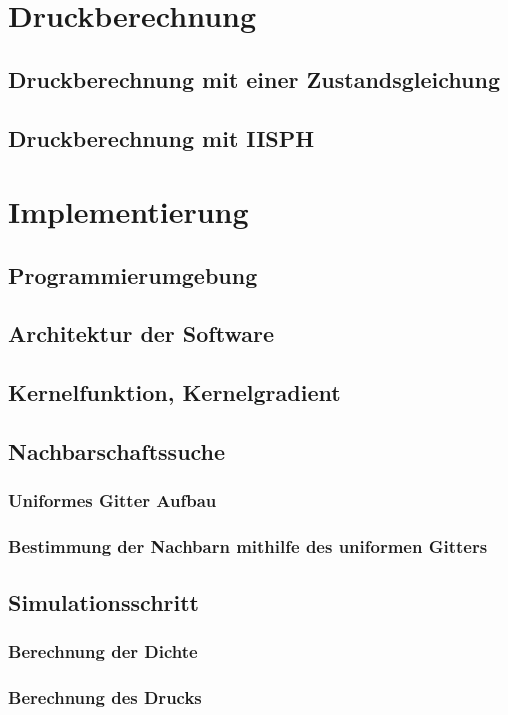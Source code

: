\documentclass{scrreprt}
\begin{document}
\chapter{Druckberechnung}
\section{Druckberechnung mit einer Zustandsgleichung}
\section{Druckberechnung mit IISPH}
\chapter{Implementierung}
\section{Programmierumgebung}
\section{Architektur der Software}
\section{Kernelfunktion, Kernelgradient}
\section{Nachbarschaftssuche}
\subsection{Uniformes Gitter Aufbau}
\subsection{Bestimmung der Nachbarn mithilfe des uniformen Gitters}
\subsection{}
\section{Simulationsschritt}
\subsection{Berechnung der Dichte}
\subsection{Berechnung des Drucks}
\end{document}

